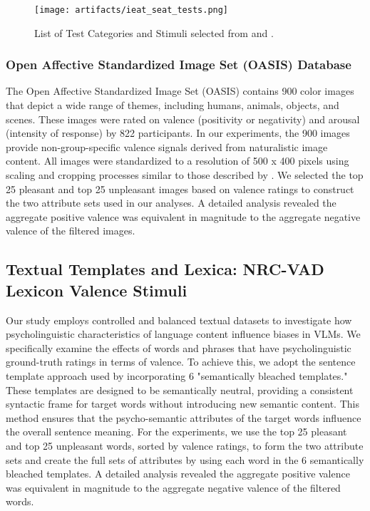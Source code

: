 \begin{figure*}[h]
    \centering
    \texttt{[image: artifacts/ieat\_seat\_tests.png]}
    \caption{List of Test Categories and Stimuli selected from \citet{May2019OnEncoders} and \citet{Steed2021}.}
    \label{fig:ieat-seat-tests}
\end{figure*}

\subsubsection{Open Affective Standardized Image Set (OASIS) Database}

The Open Affective Standardized Image Set (OASIS) \cite{kurdi2017introducing} contains 900 color images that depict a wide range of themes, including humans, animals, objects, and scenes. These images were rated on valence (positivity or negativity) and arousal (intensity of response) by 822 participants. In our experiments, the 900 images provide non-group-specific valence signals derived from naturalistic image content. All images were standardized to a resolution of 500 x 400 pixels using scaling and cropping processes similar to those described by \citet{wolfe2022evidence}. We selected the top 25 pleasant and top 25 unpleasant images based on valence ratings to construct the two attribute sets used in our analyses. A detailed analysis revealed the aggregate positive valence was equivalent in magnitude to the aggregate negative valence of the filtered images.

\subsection{Textual Templates and Lexica: NRC-VAD Lexicon Valence Stimuli}
Our study employs controlled and balanced textual datasets to investigate how psycholinguistic characteristics of language content influence biases in VLMs. We specifically examine the effects of words and phrases that have psycholinguistic ground-truth ratings in terms of valence. To achieve this, we adopt the sentence template approach used by \citet{May2019OnEncoders} incorporating 6 "semantically bleached templates." These templates are designed to be semantically neutral, providing a consistent syntactic frame for target words without introducing new semantic content. This method ensures that the psycho-semantic attributes of the target words influence the overall sentence meaning. For the experiments, we use the top 25 pleasant and top 25 unpleasant words, sorted by valence ratings, to form the two attribute sets and create the full sets of attributes by using each word in the 6 semantically bleached templates. A detailed analysis revealed the aggregate positive valence was equivalent in magnitude to the aggregate negative valence of the filtered words.

